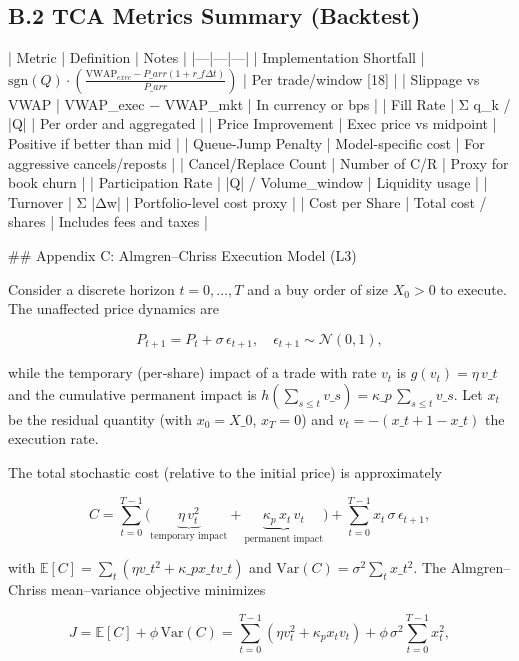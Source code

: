 \documentclass[11pt,a4paper]{article}
\begin{document}
\subsection{B.2 TCA Metrics Summary (Backtest)}

| Metric | Definition | Notes |
|---|---|---|
| Implementation Shortfall | $\text{sgn}(Q) \cdot \left(\frac{\text{VWAP}_{exec} - P\_{arr}(1+r\_f \Delta t)}{P\_{arr}}\right)$ | Per trade/window [18] |
| Slippage vs VWAP | VWAP_exec − VWAP_mkt | In currency or bps |
| Fill Rate | Σ q_k / |Q| | Per order and aggregated |
| Price Improvement | Exec price vs midpoint | Positive if better than mid |
| Queue-Jump Penalty | Model-specific cost | For aggressive cancels/reposts |
| Cancel/Replace Count | Number of C/R | Proxy for book churn |
| Participation Rate | |Q| / Volume_window | Liquidity usage |
| Turnover | Σ |Δw| | Portfolio-level cost proxy |
| Cost per Share | Total cost / shares | Includes fees and taxes |
 
\#\# Appendix C: Almgren–Chriss Execution Model (L3)

Consider a discrete horizon $t=0,\ldots,T$ and a buy order of size $X_0>0$ to execute. The unaffected price dynamics are

\begin{equation}
P_{t+1} = P_t + \sigma\,\epsilon_{t+1},\quad \epsilon_{t+1}\sim\mathcal{N}(0,1),
\end{equation}

while the temporary (per‑share) impact of a trade with rate $v_t$ is $g(v_t)=\eta\,v\_t$ and the cumulative permanent impact is $h(\sum_{s\le t} v\_s)=\kappa\_p\,\sum_{s\le t} v\_s$. Let $x_t$ be the residual quantity (with $x_0=X\_0$, $x_T=0$) and $v_t=-(x\_{t+1}-x\_t)$ the execution rate.

The total stochastic cost (relative to the initial price) is approximately

\begin{equation}
C = \sum_{t=0}^{T-1} \big( \underbrace{\eta\,v_t^2}_{\text{temporary impact}} + \underbrace{\kappa_p\,x_t\,v_t}_{\text{permanent impact}} \big) + \sum_{t=0}^{T-1} x_t\,\sigma\,\epsilon_{t+1},
\end{equation}

with $\mathbb{E}[C] = \sum_t (\eta v\_t^2 + \kappa\_p x\_t v\_t)$ and $\mathrm{Var}(C)=\sigma^2\sum_t x\_t^2$. The Almgren–Chriss mean–variance objective minimizes

\begin{equation}
J = \mathbb{E}[C] + \phi\,\mathrm{Var}(C) = \sum_{t=0}^{T-1} (\eta v_t^2 + \kappa_p x_t v_t) + \phi\,\sigma^2\sum_{t=0}^{T-1} x_t^2,
\end{equation}
\end{document}

